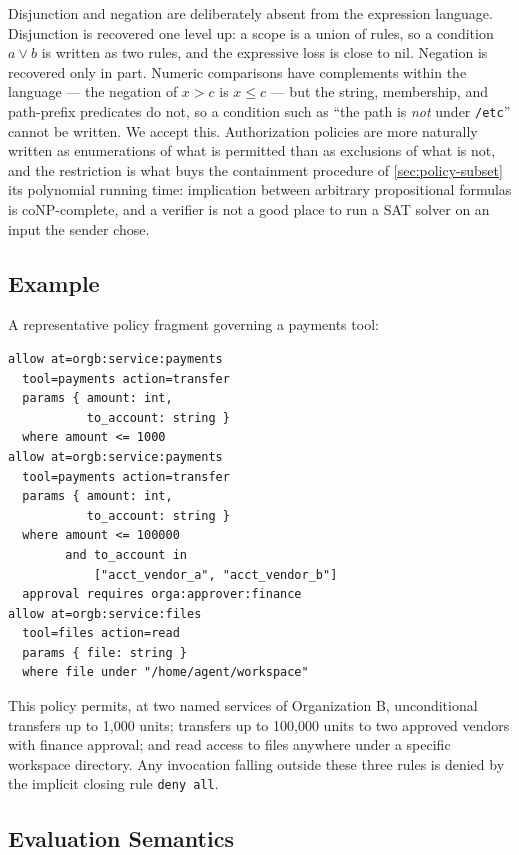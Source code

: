 \documentclass[11pt,a4paper]{article}
\begin{document}
Disjunction and negation are deliberately absent from the expression
language. Disjunction is recovered one level up: a scope is a union of
rules, so a condition $a \lor b$ is written as two rules, and the
expressive loss is close to nil. Negation is recovered only in part.
Numeric comparisons have complements within the language --- the
negation of $x > c$ is $x \le c$ --- but the string, membership, and
path-prefix predicates do not, so a condition such as ``the path is
\emph{not} under \texttt{/etc}'' cannot be written. We accept this.
Authorization policies are more naturally written as enumerations of
what is permitted than as exclusions of what is not, and the restriction
is what buys the containment procedure of \cref{sec:policy-subset} its
polynomial running time: implication between arbitrary propositional
formulas is coNP-complete, and a verifier is not a good place to run a
SAT solver on an input the sender chose.

\subsection{Example}
\label{sec:policy-example}

A representative policy fragment governing a payments tool:

\begin{lstlisting}[basicstyle=\ttfamily\footnotesize]
allow at=orgb:service:payments
  tool=payments action=transfer
  params { amount: int,
           to_account: string }
  where amount <= 1000
allow at=orgb:service:payments
  tool=payments action=transfer
  params { amount: int,
           to_account: string }
  where amount <= 100000
        and to_account in
            ["acct_vendor_a", "acct_vendor_b"]
  approval requires orga:approver:finance
allow at=orgb:service:files
  tool=files action=read
  params { file: string }
  where file under "/home/agent/workspace"
\end{lstlisting}

This policy permits, at two named services of Organization B,
unconditional transfers up to 1{,}000 units; transfers up to 100{,}000
units to two approved vendors with finance approval; and read access to
files anywhere under a specific workspace directory. Any invocation falling outside these three rules is denied
by the implicit closing rule \texttt{deny all}.

\subsection{Evaluation Semantics}
\label{sec:policy-eval}
\end{document}
